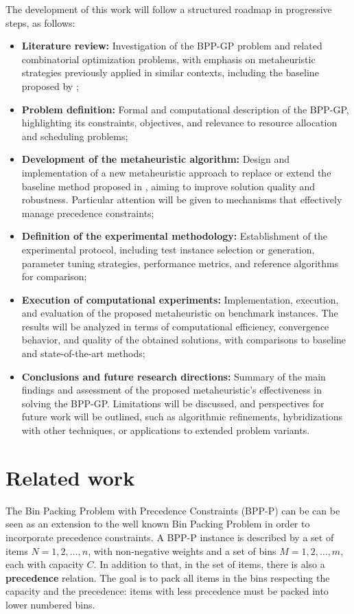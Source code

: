 \documentclass[12pt]{article}
\begin{document}
The development of this work will follow a structured roadmap in progressive steps, as follows:
\begin{itemize}
  \item \textbf{Literature review:} Investigation of the BPP-GP problem and related combinatorial optimization problems, with emphasis on metaheuristic strategies previously applied in similar contexts, including the baseline proposed by \cite{kramer:17};
  \item \textbf{Problem definition:} Formal and computational description of the BPP-GP, highlighting its constraints, objectives, and relevance to resource allocation and scheduling problems;
  \item \textbf{Development of the metaheuristic algorithm:} Design and implementation of a new metaheuristic approach to replace or extend the baseline method proposed in \cite{kramer:17}, aiming to improve solution quality and robustness. Particular attention will be given to mechanisms that effectively manage precedence constraints;
  \item \textbf{Definition of the experimental methodology:} Establishment of the experimental protocol, including test instance selection or generation, parameter tuning strategies, performance metrics, and reference algorithms for comparison;
  \item \textbf{Execution of computational experiments:} Implementation, execution, and evaluation of the proposed metaheuristic on benchmark instances. The results will be analyzed in terms of computational efficiency, convergence behavior, and quality of the obtained solutions, with comparisons to baseline and state-of-the-art methods;
  \item \textbf{Conclusions and future research directions:} Summary of the main findings and assessment of the proposed metaheuristic’s effectiveness in solving the BPP-GP. Limitations will be discussed, and perspectives for future work will be outlined, such as algorithmic refinements, hybridizations with other techniques, or applications to extended problem variants.
\end{itemize}

\newpage
\section{Related work}

The Bin Packing Problem with Precedence Constraints (BPP-P) can be can be seen as an extension to the well known Bin Packing Problem in order to incorporate precedence constraints. A BPP-P instance is described by a set of items \(N = {1, 2, \dots, n}\), with non-negative weights and a set of bins \(M = {1, 2, \dots, m}\), each with capacity \(C\). In addition to that, in the set of items, there is also a \textbf{precedence} relation. The goal is to pack all items in the bins respecting the capacity and the precedence: items with less precedence must be packed into lower numbered bins.
\end{document}
